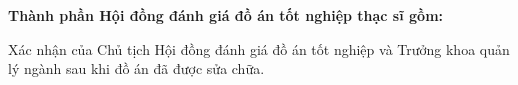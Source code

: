 {\begin{minipage}[t][0.9\textheight]{\textwidth}
    \vspace{2mm}

    {\centering\fontsize{13pt}{15pt}\selectfont\textbf{Thành phần Hội đồng đánh giá đồ án tốt nghiệp thạc sĩ gồm:}\par}

    \fontsize{13pt}{15pt}

    {\fontsize{13pt}{15pt}\selectfont\raggedright\noindent Xác nhận của Chủ tịch Hội đồng đánh giá đồ án tốt nghiệp và Trưởng khoa quản lý ngành sau khi đồ án đã được sửa chữa.\par}

    \vspace{1cm}

    \noindent
    \begin{minipage}[t]{0.47\textwidth}
    \\
    \vspace{3cm} %
    \end{minipage}
    \hfill
    \begin{minipage}[t]{0.47\textwidth}
    \\
    \vspace{3cm} %
    \end{minipage}

\end{minipage}
}
